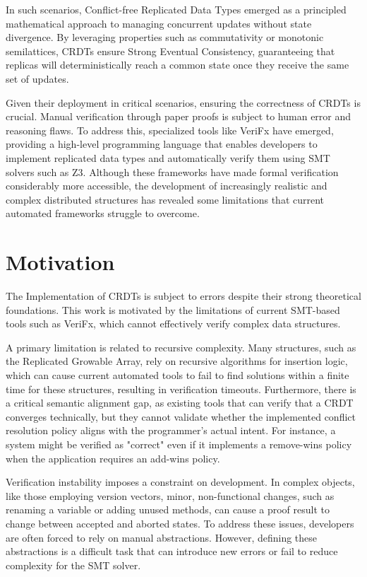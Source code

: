 In such scenarios, Conflict-free Replicated Data Types emerged as a principled mathematical approach to managing concurrent updates without state divergence. By leveraging properties such as commutativity or monotonic semilattices, CRDTs ensure Strong Eventual Consistency, guaranteeing that replicas will deterministically reach a common state once they receive the same set of updates.

Given their deployment in critical scenarios, ensuring the correctness of CRDTs is crucial. Manual verification through paper proofs is subject to human error and reasoning flaws. To address this, specialized tools like VeriFx have emerged, providing a high-level programming language that enables developers to implement replicated data types and automatically verify them using SMT solvers such as Z3. Although these frameworks have made formal verification considerably more accessible, the development of increasingly realistic and complex distributed structures has revealed some limitations that current automated frameworks struggle to overcome.

\section{Motivation}
\label{sec:motivation}

The Implementation of CRDTs is subject to errors despite their strong theoretical foundations. This work is motivated by the limitations of current SMT-based tools such as VeriFx, which cannot effectively verify complex data structures.

A primary limitation is related to recursive complexity. Many structures, such as the Replicated Growable Array, rely on recursive algorithms for insertion logic, which can cause current automated tools to fail to find solutions within a finite time for these structures, resulting in verification timeouts. Furthermore, there is a critical semantic alignment gap, as existing tools that can verify that a CRDT converges technically, but they cannot validate whether the implemented conflict resolution policy aligns with the programmer’s actual intent. For instance, a system might be verified as "correct" even if it implements a remove-wins policy when the application requires an add-wins policy.

Verification instability imposes a constraint on development. In complex objects, like those employing version vectors, minor, non-functional changes, such as renaming a variable or adding unused methods, can cause a proof result to change between accepted and aborted states. To address these issues, developers are often forced to rely on manual abstractions. However, defining these abstractions is a difficult task that can introduce new errors or fail to reduce complexity for the SMT solver.

